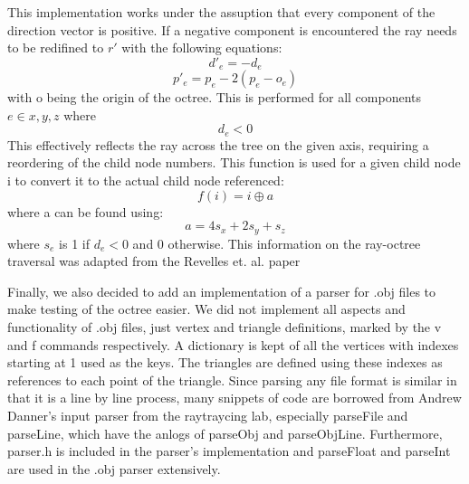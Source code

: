         \par This implementation works under the assuption that every component of the direction vector is positive. If a negative component is encountered the ray needs to be redifined to $r'$ with the following equations:
$$ d'_e = -d_e $$
$$ p'_e = p_e - 2(p_e - o_e) $$
with o being the origin of the octree. This is performed for all components $e \in {x,y,z}$  where
$$ d_e < 0 $$
This effectively reflects the ray across the tree on the given axis, requiring a reordering of the child node numbers. This function is used for a given child node i to convert it to the actual child node referenced:
$$ f(i) = i \oplus a $$
where a can be found using:
$$ a = 4s_x + 2s_y + s_z $$
where $s_e$ is 1 if $d_e < 0$ and 0 otherwise. This information on the ray-octree traversal was adapted from the Revelles et. al. paper\cite{traversal}


        \par Finally, we also decided to add an implementation of a parser for .obj files to make testing of the octree easier. We did not implement all aspects and functionality of .obj files, just vertex and triangle definitions, marked by the v and f commands respectively. A dictionary is kept of all the vertices with indexes starting at 1 used as the keys. The triangles are defined using these indexes as references to each point of the triangle. Since parsing any file format is similar in that it is a line by line process, many snippets of code are borrowed from Andrew Danner's input parser from the raytraycing lab, especially parseFile and parseLine, which have the anlogs of parseObj and parseObjLine. Furthermore, parser.h is included in the parser's implementation and parseFloat and parseInt are used in the .obj parser extensively.



